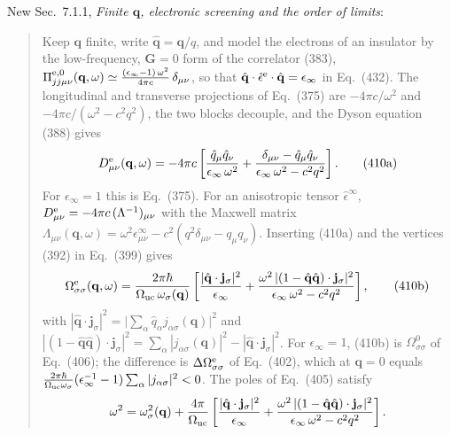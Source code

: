 \noindent New Sec.~7.1.1, \emph{Finite $\mathbf q$, electronic screening and the order of limits}:
\begin{quote}
Keep $\mathbf q$ finite, write $\hat{\mathbf q}=\mathbf q/q$, and model the electrons of an
insulator by the low-frequency, $\mathbf G=0$ form of the correlator (383),
$\Pi^{\rm e,0}_{jj\mu\nu}(\mathbf q,\omega)\simeq\frac{(\epsilon_\infty-1)\,\omega^2}{4\pi c}\,\delta_{\mu\nu}$,
so that $\hat{\mathbf q}\cdot\hat\epsilon^{\rm e}\cdot\hat{\mathbf q}=\epsilon_\infty$ in Eq.~(432).
The longitudinal and transverse projections of Eq.~(375) are $-4\pi c/\omega^2$ and
$-4\pi c/(\omega^2-c^2q^2)$, the two blocks decouple, and the Dyson equation (388) gives
\begin{equation*}
D^{\rm e}_{\mu\nu}(\mathbf q,\omega)=-4\pi c\left[\frac{\hat q_\mu\hat q_\nu}{\epsilon_\infty\,\omega^2}
+\frac{\delta_{\mu\nu}-\hat q_\mu\hat q_\nu}{\epsilon_\infty\,\omega^2-c^2q^2}\right].
\tag{410a}
\end{equation*}
For $\epsilon_\infty=1$ this is Eq.~(375). For an anisotropic tensor $\hat\epsilon^\infty$,
$D^{\rm e}_{\mu\nu}=-4\pi c\,(\Lambda^{-1})_{\mu\nu}$ with the Maxwell matrix
$\Lambda_{\mu\nu}(\mathbf q,\omega)=\omega^2\epsilon^\infty_{\mu\nu}-c^2(q^2\delta_{\mu\nu}-q_\mu q_\nu)$.
Inserting (410a) and the vertices (392) in Eq.~(399) gives
\begin{equation*}
\Omega^{\rm e}_{\sigma\sigma}(\mathbf q,\omega)=\frac{2\pi\hbar}{\Omega_{\rm uc}\,\omega_\sigma(\mathbf q)}
\left[\frac{|\hat{\mathbf q}\cdot\mathbf j_\sigma|^2}{\epsilon_\infty}
+\frac{\omega^2\,|(1-\hat{\mathbf q}\hat{\mathbf q})\cdot\mathbf j_\sigma|^2}{\epsilon_\infty\,\omega^2-c^2q^2}\right],
\tag{410b}
\end{equation*}
with $|\hat{\mathbf q}\cdot\mathbf j_\sigma|^2=\big|\sum_\alpha\hat q_\alpha j_{\alpha\sigma}(\mathbf q)\big|^2$ and
$|(1-\hat{\mathbf q}\hat{\mathbf q})\cdot\mathbf j_\sigma|^2=\sum_\alpha|j_{\alpha\sigma}(\mathbf q)|^2-|\hat{\mathbf q}\cdot\mathbf j_\sigma|^2$.
For $\epsilon_\infty=1$, (410b) is $\Omega^0_{\sigma\sigma}$ of Eq.~(406); the difference is
$\Delta\Omega^{\rm e}_{\sigma\sigma}$ of Eq.~(402), which at $\mathbf q=0$ equals
$\frac{2\pi\hbar}{\Omega_{\rm uc}\omega_\sigma}(\epsilon_\infty^{-1}-1)\sum_\alpha|j_{\alpha\sigma}|^2<0$.
The poles of Eq.~(405) satisfy
\begin{equation*}
\omega^2=\omega^2_\sigma(\mathbf q)+\frac{4\pi}{\Omega_{\rm uc}}
\left[\frac{|\hat{\mathbf q}\cdot\mathbf j_\sigma|^2}{\epsilon_\infty}
+\frac{\omega^2\,|(1-\hat{\mathbf q}\hat{\mathbf q})\cdot\mathbf j_\sigma|^2}{\epsilon_\infty\,\omega^2-c^2q^2}\right].

\end{equation*}
\end{quote}
